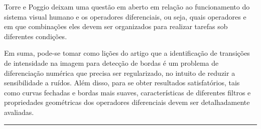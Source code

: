 \begin{enumerate}
\begin{enumerate}[label*=\arabic*.]
    Torre e Poggio deixam uma questão em aberto em relação ao funcionamento do sistema visual humano e os operadores diferenciais, ou seja, quais operadores e em que combinações eles devem ser organizados para realizar tarefas sob diferentes condições.
    
    Em suma, pode-se tomar como lições do artigo que a identificação de transições de intensidade na imagem para detecção de bordas é um problema de diferenciação numérica que precisa ser regularizado, no intuito de reduzir a sensibilidade a ruídos. Além disso, para se obter resultados satisfatórios, tais como curvas fechadas e bordas mais suaves, características de diferentes filtros e propriedades geométricas dos operadores diferenciais devem ser detalhadamente avaliadas.

\end{enumerate}
\end{enumerate}

\noindent\rule{14.5cm}{0.4pt}